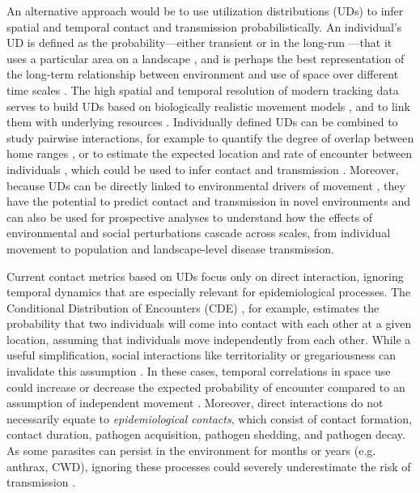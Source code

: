 \documentclass[letterpaper]{article}
\begin{document}
An alternative approach would be to use utilization distributions (UDs) to infer spatial and temporal contact and transmission probabilistically. An individual's UD is defined as the probability---either transient or in the long-run \citep{Tao2016}---that it uses a particular area on a landscape \citep{Worton1989}, and is perhaps the best representation of the long-term relationship between environment and use of space over different time scales \citet{Webber2023}. The high spatial and temporal resolution of modern tracking data serves to build UDs based on biologically realistic movement models \citep{Kranstauber2012,Fleming2014}, and to link them with underlying resources \citep{Potts2023}.
Individually defined UDs can be combined to study pairwise interactions, for example to quantify the degree of overlap between home ranges \citep{Winner2018}, or to estimate the expected location and rate of encounter between individuals  \citep{Noonan2021}, which could be used to infer contact and transmission \citep{Godfrey2010, Godfrey2013,Noonan2021}. 
Moreover, because UDs can be directly linked to environmental drivers of movement \citep{Signer2017}, they have the potential to predict contact and transmission in novel environments and can also be used for prospective analyses to understand how the effects of environmental and social perturbations cascade across scales, from individual movement to population and landscape-level disease transmission. 

Current contact metrics based on UDs focus only on direct interaction, ignoring temporal dynamics that are especially relevant for epidemiological processes. The Conditional Distribution of Encounters (CDE) \citep{Noonan2021}, for example, estimates the probability that two individuals will come into contact with each other at a given location, assuming that individuals move independently from each other.
While a useful simplification, social interactions like territoriality or gregariousness can invalidate this assumption \citep{Manlove2018,Sah2018}. In these cases, temporal correlations in space use could increase or decrease the expected probability of encounter compared to an assumption of independent movement \citep{Kjaer2008,Schauber2015a}. 
Moreover, direct interactions do not necessarily equate to \emph{epidemiological contacts}, which consist of contact formation, contact duration, pathogen acquisition, pathogen shedding, and pathogen decay. As some parasites can persist in the environment for months or years (e.g. anthrax, CWD), ignoring these processes could severely underestimate the risk of transmission \citep{Wilber2022,Yang2023,Richardson2015}.
\end{document}
